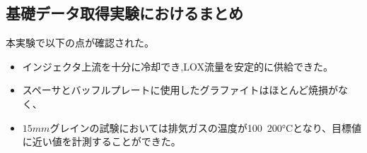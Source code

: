 \subsection{基礎データ取得実験におけるまとめ}
本実験で以下の点が確認された。
\begin{itemize}
\item インジェクタ上流を十分に冷却でき,LOX流量を安定的に供給できた。
\item スペーサとバッフルプレートに使用したグラファイトはほとんど焼損がなく、
\item $15mm$グレインの試験においては排気ガスの温度が100~200°Cとなり、目標値に近い値を計測することができた。
\end{itemize}
